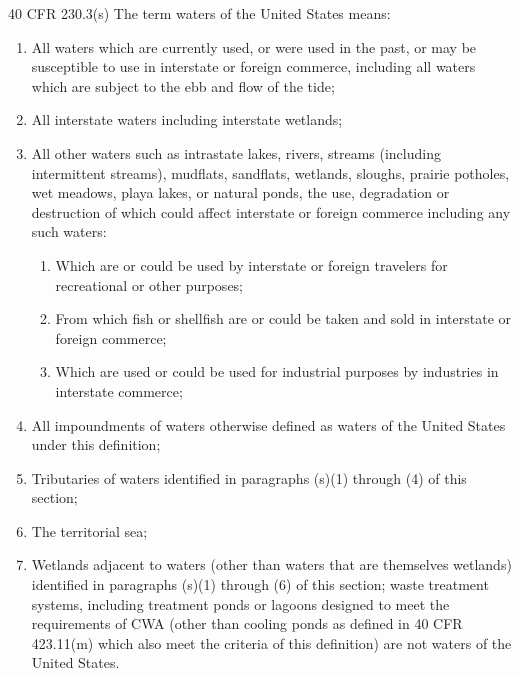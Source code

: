 \documentclass[aspectratio=169]{beamer}
\theoremstyle{principle}
\begin{document}
\begin{frame}
\footnotesize 40 CFR 230.3(s)  The term waters of the United States means:
\begin{enumerate}
\item All waters which are currently used, or were used in the past, or may be susceptible to use in interstate or foreign commerce, including all waters which are subject to the ebb and flow of the tide;
\item All interstate waters including interstate wetlands;
\item All other waters such as intrastate lakes, rivers, streams (including intermittent streams), mudflats, sandflats, wetlands, sloughs, prairie potholes, wet meadows, playa lakes, or natural ponds, the use, degradation or destruction of which could affect interstate or foreign commerce including any such waters: 
\begin{enumerate}
\item Which are or could be used by interstate or foreign travelers for recreational or other purposes;
\item From which fish or shellfish are or could be taken and sold in interstate or foreign commerce;
\item Which are used or could be used for industrial purposes by industries in interstate commerce;
\end{enumerate}
\item All impoundments of waters otherwise defined as waters of the United States under this definition;
\item Tributaries of waters identified in paragraphs (s)(1) through (4) of this section;
\item The territorial sea;
\item Wetlands adjacent to waters (other than waters that are themselves wetlands) identified in paragraphs (s)(1) through (6) of this section; waste treatment systems, including treatment ponds or lagoons designed to meet the requirements of CWA (other than cooling ponds as defined in 40 CFR 423.11(m) which also meet the criteria of this definition) are not waters of the United States.
\end{enumerate}
\end{frame}
\end{document}
